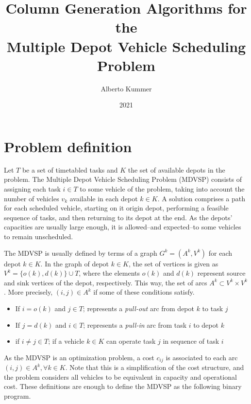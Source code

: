 \documentclass{article}
\title{Column Generation Algorithms for the\\Multiple Depot Vehicle Scheduling Problem}
\author{Alberto Kummer}
\date{2021}
\begin{document}
\maketitle

\section{Problem definition}
\label{section:problem-definition}

Let $T$ be a set of timetabled tasks and $K$ the set of available depots in the problem. The Multiple Depot Vehicle Scheduling Problem (MDVSP) consists of assigning each task $i \in T$ to some vehicle of the problem, taking into account the number of vehicles $v_k$ available in each depot $k \in K$. A solution comprises a path for each scheduled vehicle, starting on it origin depot, performing a feasible sequence of tasks, and then returning to its depot at the end. As the depots' capacities are usually large enough, it is allowed--and expected--to some vehicles to remain unscheduled.

The MDVSP is usually defined by terms of a graph $G^k=(A^k, V^k)$ for each depot $k \in K$. In the graph of depot $k \in K$, the set of vertices is given as $V^k = \{o(k), d(k)\} \cup T$, where the elements $o(k)$ and $d(k)$ represent source and sink vertices of the depot, respectively. This way, the set of arcs $A^k \subset V^k \times V^k$. More precisely, $(i,j) \in A^k$ if some of these conditions satisfy.

\begin{itemize}
   \item If $i = o(k)$ and $j \in T$; represents a \textit{pull-out} arc from depot $k$ to task $j$
   \item If $j = d(k)$ and $i \in T$; represents a \textit{pull-in} arc from task $i$ to depot $k$
   \item if $i \neq j \in T$; if a vehicle $k \in K$ can operate task $j$ in sequence of task $i$
\end{itemize}

As the MDVSP is an optimization problem, a cost $c_{ij}$ is associated to each arc $(i,j) \in A^k, \forall k \in K$. Note that this is a simplification of the cost structure, and the problem considers all vehicles to be equivalent in capacity and operational cost. These definitions are enough to define the MDVSP as the following binary program.
\end{document}
